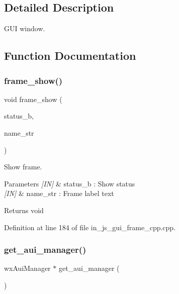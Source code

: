 \subsection{Detailed Description}
G\+UI window. 



\subsection{Function Documentation}
\mbox{\label{group___g_u_i_gac4c1be9127e4da3a01fba733688653be}} 
\subsubsection{frame\_show()}
{\footnotesize\ttfamily void frame\+\_\+show (\begin{DoxyParamCaption}\item[{bool}]{status\+\_\+b,  }\item[{wx\+String}]{name\+\_\+str }\end{DoxyParamCaption})}



Show frame. 


\begin{DoxyParams}{Parameters}
{\em \mbox{[}\+I\+N\mbox{]}} & status\+\_\+b \+: Show status \\
\hline
{\em \mbox{[}\+I\+N\mbox{]}} & name\+\_\+str \+: Frame label text \\
\hline
\end{DoxyParams}
\begin{DoxyReturn}{Returns}
void 
\end{DoxyReturn}


Definition at line 184 of file in\+\_\+js\+\_\+gui\+\_\+frame\+\_\+cpp.\+cpp.

\mbox{\label{group___g_u_i_ga0a532f834b1cca1b27d9a4d2c515d312}} 
\subsubsection{get\_aui\_manager()}
{\footnotesize\ttfamily wx\+Aui\+Manager $\ast$ get\+\_\+aui\+\_\+manager (\begin{DoxyParamCaption}\item[{void}]{ }\end{DoxyParamCaption})}



